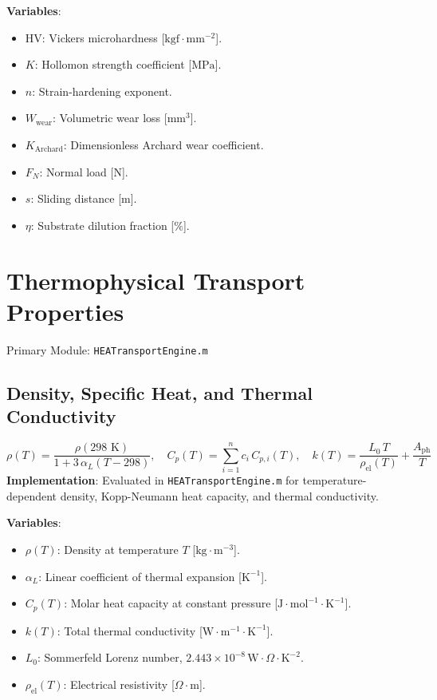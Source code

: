\documentclass[11pt,a4paper]{article}
\begin{document}
\noindent\textbf{Variables}:
\begin{itemize}
  \item $\text{HV}$: Vickers microhardness [$\text{kgf}\cdot\text{mm}^{-2}$].
  \item $K$: Hollomon strength coefficient [$\text{MPa}$].
  \item $n$: Strain-hardening exponent.
  \item $W_{\text{wear}}$: Volumetric wear loss [$\text{mm}^3$].
  \item $K_{\text{Archard}}$: Dimensionless Archard wear coefficient.
  \item $F_N$: Normal load [$\text{N}$].
  \item $s$: Sliding distance [$\text{m}$].
  \item $\eta$: Substrate dilution fraction [$\%$].
\end{itemize}

\section{Thermophysical Transport Properties}
Primary Module: \texttt{HEATransportEngine.m}

\subsection{Density, Specific Heat, and Thermal Conductivity}
\begin{equation}
\rho(T) = \frac{\rho(298\text{ K})}{1 + 3 \, \alpha_L (T - 298)}, \quad C_p(T) = \sum_{i=1}^n c_i \, C_{p, i}(T), \quad k(T) = \frac{L_0 \, T}{\rho_{\text{el}}(T)} + \frac{A_{\text{ph}}}{T}
\end{equation}
\textbf{Implementation}: Evaluated in \texttt{HEATransportEngine.m} for temperature-dependent density, Kopp-Neumann heat capacity, and thermal conductivity.

\noindent\textbf{Variables}:
\begin{itemize}
  \item $\rho(T)$: Density at temperature $T$ [$\text{kg}\cdot\text{m}^{-3}$].
  \item $\alpha_L$: Linear coefficient of thermal expansion [$\text{K}^{-1}$].
  \item $C_p(T)$: Molar heat capacity at constant pressure [$\text{J}\cdot\text{mol}^{-1}\cdot\text{K}^{-1}$].
  \item $k(T)$: Total thermal conductivity [$\text{W}\cdot\text{m}^{-1}\cdot\text{K}^{-1}$].
  \item $L_0$: Sommerfeld Lorenz number, $2.443 \times 10^{-8} \, \text{W}\cdot\Omega\cdot\text{K}^{-2}$.
  \item $\rho_{\text{el}}(T)$: Electrical resistivity [$\Omega\cdot\text{m}$].
\end{itemize}
\end{document}

